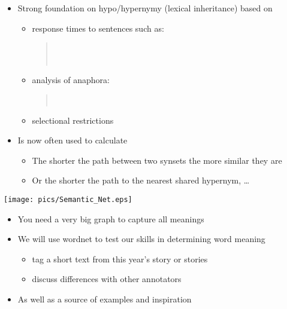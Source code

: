 \documentclass[a4paper,landscape,headrule,footrule,xetex]{foils}
\begin{document}
\begin{itemize}
\item Strong foundation on hypo/hypernymy (lexical inheritance) based on
  \begin{itemize}
  \item   response times to sentences such as:
    \begin{quote}%
      \\
      \\
    \end{quote}
  \item analysis of anaphora:
    \begin{quote}%
      \\
    \end{quote}
  \item selectional restrictions
  \end{itemize}
\item Is now often used to calculate 
  \begin{itemize}
  \item The shorter the path between two synsets the more similar they are
  \item Or the shorter the path to the nearest shared hypernym, \ldots
  \end{itemize}
\end{itemize}


\MyLogo{}
\bigskip
\bigskip
\bigskip
\texttt{[image: pics/Semantic\_Net.eps]}

\begin{itemize}
\item You need a very big graph to capture all meanings
\end{itemize}





\begin{itemize}
\item We will use wordnet to test our skills in determining word meaning
  \begin{itemize}
  \item tag a short text from this year's story or stories
  \item discuss differences with other annotators
 \end{itemize}
\item As well as a source of examples and inspiration
\end{itemize}
\end{document}

